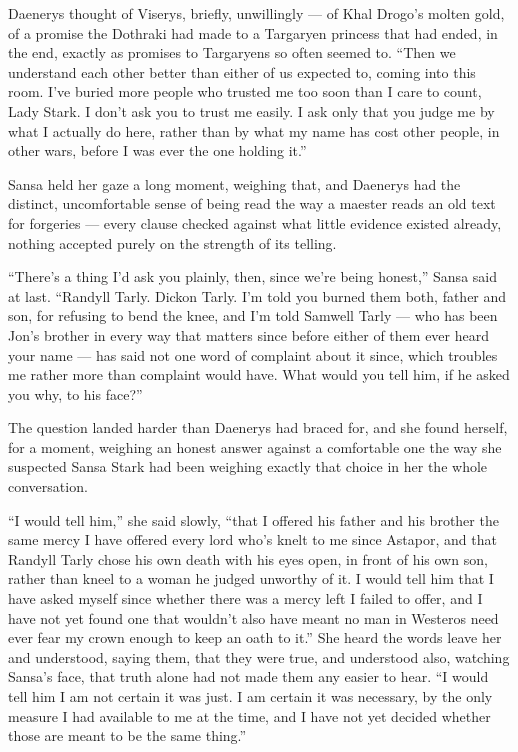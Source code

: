 Daenerys thought of Viserys, briefly, unwillingly — of Khal Drogo’s molten gold, of a promise the Dothraki had made to a Targaryen princess that had ended, in the end, exactly as promises to Targaryens so often seemed to. “Then we understand each other better than either of us expected to, coming into this room. I’ve buried more people who trusted me too soon than I care to count, Lady Stark. I don’t ask you to trust me easily. I ask only that you judge me by what I actually do here, rather than by what my name has cost other people, in other wars, before I was ever the one holding it.”

Sansa held her gaze a long moment, weighing that, and Daenerys had the distinct, uncomfortable sense of being read the way a maester reads an old text for forgeries — every clause checked against what little evidence existed already, nothing accepted purely on the strength of its telling.

“There’s a thing I’d ask you plainly, then, since we’re being honest,” Sansa said at last. “Randyll Tarly. Dickon Tarly. I’m told you burned them both, father and son, for refusing to bend the knee, and I’m told Samwell Tarly — who has been Jon’s brother in every way that matters since before either of them ever heard your name — has said not one word of complaint about it since, which troubles me rather more than complaint would have. What would you tell him, if he asked you why, to his face?”

The question landed harder than Daenerys had braced for, and she found herself, for a moment, weighing an honest answer against a comfortable one the way she suspected Sansa Stark had been weighing exactly that choice in her the whole conversation.

“I would tell him,” she said slowly, “that I offered his father and his brother the same mercy I have offered every lord who’s knelt to me since Astapor, and that Randyll Tarly chose his own death with his eyes open, in front of his own son, rather than kneel to a woman he judged unworthy of it. I would tell him that I have asked myself since whether there was a mercy left I failed to offer, and I have not yet found one that wouldn’t also have meant no man in Westeros need ever fear my crown enough to keep an oath to it.” She heard the words leave her and understood, saying them, that they were true, and understood also, watching Sansa’s face, that truth alone had not made them any easier to hear. “I would tell him I am not certain it was just. I am certain it was necessary, by the only measure I had available to me at the time, and I have not yet decided whether those are meant to be the same thing.”


